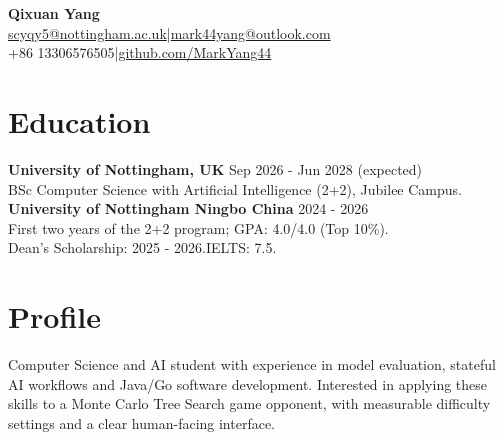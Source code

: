 \documentclass[11pt,a4paper]{article}
\begin{document}
\begin{center}
{\LARGE\bfseries\color{navy} Qixuan Yang}\\[3pt]
{\small\href{mailto:scyqy5@nottingham.ac.uk}{scyqy5@nottingham.ac.uk}\enspace|\enspace\href{mailto:mark44yang@outlook.com}{mark44yang@outlook.com}\\[2pt]
+86 13306576505\enspace|\enspace\href{https://github.com/MarkYang44}{github.com/MarkYang44}}
\end{center}
\section*{Education}
\textbf{University of Nottingham, UK} \hfill Sep 2026 - Jun 2028 (expected)\\
BSc Computer Science with Artificial Intelligence (2+2), Jubilee Campus.\\[2pt]
\textbf{University of Nottingham Ningbo China} \hfill 2024 - 2026\\
First two years of the 2+2 program; GPA: 4.0/4.0 (Top 10\%).\\
Dean's Scholarship: 2025 - 2026.\quad IELTS: 7.5.

\section*{Profile}
Computer Science and AI student with experience in model evaluation, stateful AI workflows and Java/Go software development. Interested in applying these skills to a Monte Carlo Tree Search game opponent, with measurable difficulty settings and a clear human-facing interface.
\end{document}

